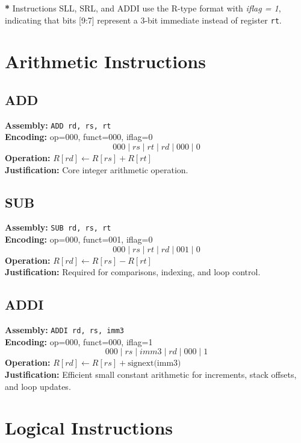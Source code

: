 \documentclass[12pt]{report}
\begin{document}
\noindent\textbf{*} Instructions SLL, SRL, and ADDI use the R-type format with \textit{iflag = 1},  
indicating that bits [9:7] represent a 3-bit immediate instead of register \texttt{rt}.

\section{Arithmetic Instructions}

\subsection*{ADD}
\textbf{Assembly:} \texttt{ADD rd, rs, rt} \\
\textbf{Encoding:} op=000, funct=000, iflag=0 
\[
000 \;|\; rs \;|\; rt \;|\; rd \;|\; 000 \;|\; 0
\]
\textbf{Operation:} \( R[rd] \leftarrow R[rs] + R[rt] \) \\
\textbf{Justification:} Core integer arithmetic operation.

\vspace{1em}

\subsection*{SUB}

\textbf{Assembly:} \texttt{SUB rd, rs, rt} \\
\textbf{Encoding:} op=000, funct=001, iflag=0 
\[
000 \;|\; rs \;|\; rt \;|\; rd \;|\; 001 \;|\; 0
\]
\textbf{Operation:} \( R[rd] \leftarrow R[rs] - R[rt] \) \\
\textbf{Justification:} Required for comparisons, indexing, and loop control.

\vspace{1em}

\subsection*{ADDI}
\textbf{Assembly:} \texttt{ADDI rd, rs, imm3} \\
\textbf{Encoding:} op=000, funct=000, iflag=1 
\[
000 \;|\; rs \;|\; imm3 \;|\; rd \;|\; 000 \;|\; 1
\]
\textbf{Operation:} \( R[rd] \leftarrow R[rs] + \text{signext(imm3)} \) \\
\textbf{Justification:} Efficient small constant arithmetic for increments, stack offsets, and loop updates.

\section{Logical Instructions}
\end{document}
